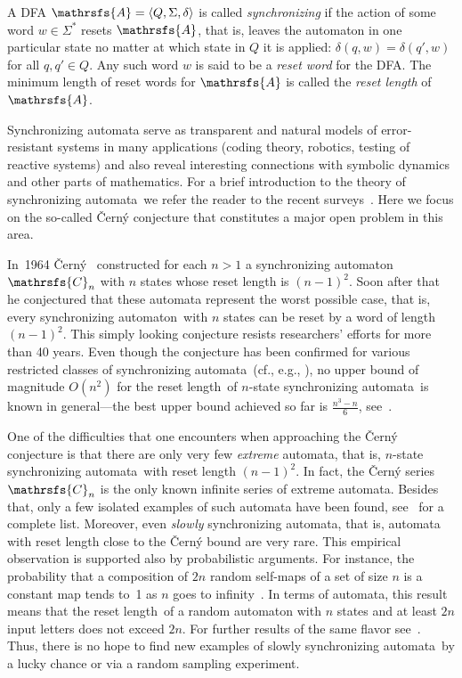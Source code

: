 \documentclass[11pt]{llncs}
\newcommand{\sa}{synchronizing automata}
\newcommand{\san}{synchronizing automaton}
\newcommand{\rl}{reset length}
\begin{document}
A DFA $\mathrsfs{A}=\langle Q,\Sigma,\delta\rangle$ is called
\emph{synchronizing} if the action of some word $w\in\Sigma^*$
resets $\mathrsfs{A}$, that is, leaves the automaton in one
particular state no matter at which state in $Q$ it is applied:
$\delta(q,w)=\delta(q',w)$ for all $q,q'\in Q$. Any such word $w$
is said to be a \emph{reset word} for the DFA. The minimum length
of reset words for $\mathrsfs{A}$ is called the \emph{\rl} of
$\mathrsfs{A}$.

Synchronizing automata serve as transparent and natural models of
error-resistant systems in many applications (coding theory, robotics,
testing of reactive systems) and also reveal interesting connections
with symbolic dynamics and other parts of mathematics. For a brief
introduction to the theory of \sa\ we refer the reader to the recent
surveys~\cite{Sa05,Vo08}. Here we focus on the so-called \v{C}ern\'{y}
conjecture that constitutes a major open problem in this area.

In~1964 \v{C}ern\'{y}~\cite{Ce64} constructed for each $n>1$ a \san\
$\mathrsfs{C}_n$ with $n$ states whose reset length is $(n-1)^2$.
Soon after that he conjectured that these automata represent
the worst possible case, that is, every \san\ with $n$ states
can be reset by a word of length $(n-1)^2$. This simply looking conjecture
resists researchers' efforts for more than 40 years. Even though the
conjecture has been confirmed for various restricted classes of \sa\
(cf., e.g., \cite{Ep90,Du98,Ka03,Tr07,AS09,Vo09}), no upper bound of magnitude
$O(n^2)$ for the \rl\ of $n$-state \sa\ is known in general---the best upper
bound achieved so far is $\frac{n^3-n}6$, see~\cite{Pi83}.

One of the difficulties that one encounters when approaching the \v{C}ern\'{y}
conjecture is that there are only very few \emph{extreme} automata, that is,
$n$-state \sa\ with reset length $(n-1)^2$. In fact, the \v{C}ern\'{y} series
$\mathrsfs{C}_n$ is the only known infinite series of extreme automata. Besides
that, only a few isolated examples of such automata have been found, see~\cite{Vo08}
for a complete list. Moreover, even \emph{slowly} \sa, that is, automata with reset
length close to the \v{C}ern\'{y} bound are very rare. This empirical observation
is supported also by probabilistic arguments. For instance, the probability that
a composition of $2n$ random self-maps of a set of size $n$ is a constant map
tends to~1 as $n$ goes to infinity~\cite{Hi88}. In terms of automata, this
result means that the \rl\ of a random automaton with $n$ states and at least
$2n$ input letters does not exceed $2n$. For further results of the same
flavor see~\cite{SZ}. Thus, there is no hope to find new examples of slowly
\sa\ by a lucky chance or via a random sampling experiment.
\end{document}
